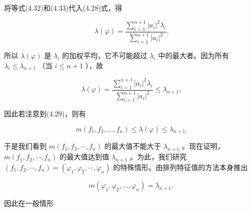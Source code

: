 将等式(4.32)和(4.33)代入(4.28)式，得

\begin{equation*}
\lambda (\varphi) = \frac {\sum_ {i = 1} ^ {n + 1} \left| a _ {i} \right| ^ {2} \lambda_ {i}}{\sum_ {i = 1} ^ {n + 1} \left| a _ {i} \right| ^ {2}}.\tag{4.34}
\end{equation*}

所以 $\lambda (\varphi)$ 是 $\lambda_{i}$ 的加权平均，它不可能超过 $\lambda_{i}$ 中的最大者。因为所有 $\lambda_{i} \leqslant \lambda_{n + 1}$ （当 $i \leqslant n + 1$ ），故

\begin{equation*}
\lambda (\varphi) = \frac {\sum_ {i = 1} ^ {n + 1} | a _ {i} | ^ {2} \lambda_ {i}}{\sum_ {i = 1} ^ {n + 1} | a _ {i} | ^ {2}} \leqslant \lambda_ {n + 1},\tag{4.35}
\end{equation*}

因此若注意到(4.29)，则有

\begin{equation*}
m (f _ {1}, f _ {2}, \dots , f _ {n}) \leqslant \lambda (\varphi) \leqslant \lambda_ {n + 1}.\tag{4.36}
\end{equation*}

于是我们看到 $m(f_{1}, f_{2}, \cdots, f_{n})$ 的最大值不能大于 $\lambda_{n+1}$ 。现在证明， $m(f_{1}, f_{2}, \cdots, f_{n})$ 的最大值达到值 $\lambda_{n+1}$ 。为此，我们研究 $(f_{1}, f_{2}, \cdots, f_{n}) = (\varphi_{1}, \varphi_{2}, \cdots, \varphi_{n})$ 的特殊情形。由排列特征值的方法本身推出

\begin{equation*}
m \left(\varphi_ {1}, \varphi_ {2}, \dots , \varphi_ {n}\right) = \lambda_ {n + 1},\tag{4.37}
\end{equation*}

因此在一般情形
